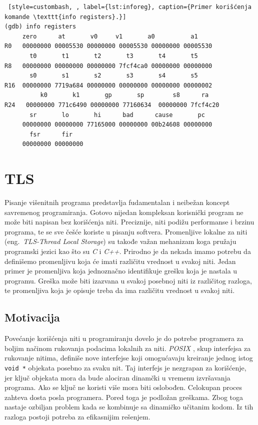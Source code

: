\documentclass[12pt,oneside]{memoir}
\begin{document}
\begin{lstlisting} [style=custombash, , label={lst:inforeg}, caption={Primer korišćenja komande \texttt{info registers}.}]
(gdb) info registers 
	 zero      at       v0     v1       a0	        a1       
R0   00000000 00005530 00000000 00005530 00000000 00005530
       t0       t1       t2       t3       t4       t5       
R8   00000000 00000000 00000000 7fcf4ca0 00000000 00000000
       s0       s1       s2       s3       s4       s5       
R16  00000000 7719a684 00000000 00000000 00000000 00000002
          k0       k1       gp       sp        s8      ra
R24   00000000 771c6490 00000000 77160634  00000000 7fcf4c20
       sr       lo       hi      bad      cause       pc
     00000000 00000000 77165000 00000000 00b24608 00000000 
       fsr      fir
     00000000 00000000
\end{lstlisting}

\chapter{TLS}
\label{chp:TLS}

Pisanje višenitnih programa predstavlja fudamentalan i neibežan koncept savremenog programiranja. Gotovo nijedan kompleksan korisnički program ne može biti napisan bez korišćenja niti. Preciznije, niti podižu performanse i brzinu programa, te se sve češće koriste u pisanju softvera. Promenljive lokalne za niti (eng.~\emph{TLS-Thread Local Storage}) su takođe važan mehanizam koga pružaju programski jezici kao što su \emph{C} i \emph{C++}. Prirodno je da nekada imamo potrebu da definišemo promenljivu koja će imati različitu vrednost u svakoj niti. Jedan primer je promenljiva koja jednoznačno identifikuje grešku koja je nastala u programu. Greška može biti izazvana u svakoj posebnoj niti iz različitog razloga, te promenljiva koja je opisuje treba da ima različitu vrednost u svakoj niti.

\section{Motivacija}

Povećanje korišćenja niti u programiranju dovelo je do potrebe programera za boljim načinom rukovanja podacima lokalnih za niti. \emph{POSIX} \cite{POSIX}, skup interfejsa za rukovanje nitima, definiše nove interfejse koji omogućavaju kreiranje jednog istog \texttt{void *} objekata posebno za svaku nit. Taj interfejs je nezgrapan za korišćenje, jer ključ objekata mora da bude alociran dinamčki u vremenu izvršavanja programa. Ako se ključ ne koristi više mora biti oslobođen. Celokupan proces zahteva dosta posla programera. Pored toga je podložan greškama. Zbog toga nastaje ozbiljan problem kada se kombinuje sa dinamičko učitanim kodom. Iz tih razloga postoji potreba za efikasnijim rešenjem.
\end{document}
